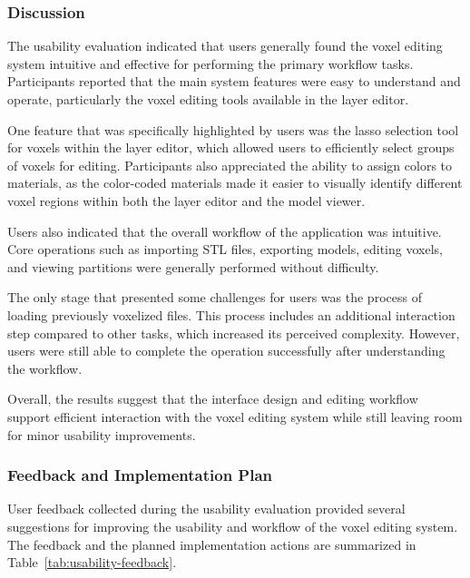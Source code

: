 \documentclass[12pt, titlepage]{article}
\begin{document}
\subsubsection{Discussion}

The usability evaluation indicated that users generally found the voxel editing system intuitive and effective for performing the primary workflow tasks. Participants reported that the main system features were easy to understand and operate, particularly the voxel editing tools available in the layer editor.

One feature that was specifically highlighted by users was the lasso selection tool for voxels within the layer editor, which allowed users to efficiently select groups of voxels for editing. Participants also appreciated the ability to assign colors to materials, as the color-coded materials made it easier to visually identify different voxel regions within both the layer editor and the model viewer.

Users also indicated that the overall workflow of the application was intuitive. Core operations such as importing STL files, exporting models, editing voxels, and viewing partitions were generally performed without difficulty.

The only stage that presented some challenges for users was the process of loading previously voxelized files. This process includes an additional interaction step compared to other tasks, which increased its perceived complexity. However, users were still able to complete the operation successfully after understanding the workflow.

Overall, the results suggest that the interface design and editing workflow support efficient interaction with the voxel editing system while still leaving room for minor usability improvements.

\subsubsection{Feedback and Implementation Plan}

User feedback collected during the usability evaluation provided several suggestions for improving the usability and workflow of the voxel editing system. The feedback and the planned implementation actions are summarized in Table~\ref{tab:usability-feedback}.
\end{document}
